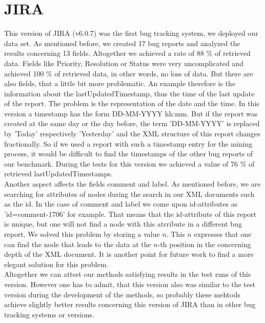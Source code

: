 \section{JIRA}
This version of JIRA (v6.0.7) was the first bug tracking system, we deployed our data set. As mentioned before, we created 17 bug reports and analyzed the results concerning 13 fields. Altogether we achieved a rate of 88 \% of retrieved data. Fields like Priority, Resolution or Status were very uncomplicated and achieved 100 \% of retrieved data, in other words, no loss of data. But there are also fields, that a little bit more problematic. An example therefore is the information about the lastUpdatedTimestamp, thus the time of the last update of the report. The problem is the representation of the date and the time. In this version a timestamp has the form DD-MM-YYYY hh:mm. But if the report was created at the same day or the day before, the term 'DD-MM-YYYY' is replaced by 'Today' respectively 'Yesterday' and the XML structure of this report changes fractionally. So if we used a report with such a timestamp entry for the mining process, it would be difficult to find the timestamps of the other bug reports of our benchmark. During the tests for this version we achieved a value of 76 \% of retrieved lastUpdatedTimestamps. \\ Another aspect affects the fields comment and label. As mentioned before, we are searching for attributes of nodes during the search in our XML documents such as the id. In the case of comment and label we come upon id-attributes as 'id=comment-1706' for example. That means that the id-attribute of this report is unique, but one will not find a node with this atrribute in a different bug report. We solved this problem by storing a value $n$. This $n$ expresses that one can find the node that leads to the data at the $n$-th position in the concerning depth of the XML document. It is another point for future work to find a more elegant solution for this problem. \\ Altogether we can attest our methods satisfying results in the test runs of this version. However one has to admit, that this version also was similar to the test version during the development of the methods, so probably these mehtods achieve slightly better results concerning this version of JIRA than in other bug tracking systems or versions.  \\

